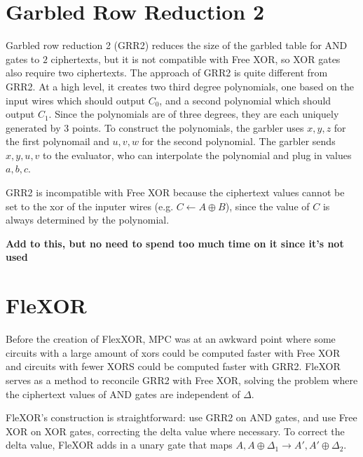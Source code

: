 \section{Garbled Row Reduction 2}
Garbled row reduction 2 (GRR2) reduces the size of the garbled table for AND gates to $2$ ciphertexts, but it is not compatible with Free XOR, so XOR gates also require two ciphertexts.
The approach of GRR2 is quite different from GRR2. 
At a high level, it creates two third degree polynomials, one based on the input wires which should output $C_0$, and a second polynomial which should output $C_1$.
Since the polynomials are of three degrees, they are each uniquely generated by $3$ points. 
To construct the polynomials, the garbler uses $x,y,z$ for the first polynomail and $u,v,w$ for the second polynomial.
The garbler sends $x,y,u,v$ to the evaluator, who can interpolate the polynomial and plug in values $a,b,c$.

GRR2 is incompatible with Free XOR because the ciphertext values cannot be set to the xor of the inputer wires (e.g. $C \gets A \oplus B$), since the value of $C$ is always determined by the polynomial.

\textbf{Add to this, but no need to spend too much time on it since it's not used}


\section{FleXOR}
Before the creation of FlexXOR, MPC was at an awkward point where some circuits with a large amount of xors could be computed faster with Free XOR and circuits with fewer XORS could be computed faster with GRR2.
FleXOR serves as a method to reconcile GRR2 with Free XOR, solving the problem where the ciphertext values of AND gates are independent of $\Delta$.

FleXOR's construction is straightforward: use GRR2 on AND gates, and use Free XOR on XOR gates, correcting the delta value where necessary.
To correct the delta value, FleXOR adds in a unary gate that maps $A, A \oplus \Delta_1 \to A', A' \oplus \Delta_2$.

